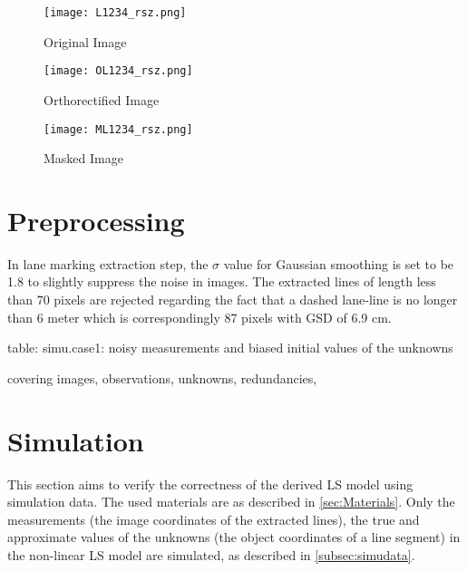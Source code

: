 \begin{figure}%
  \parbox{.475\linewidth}{
    \centering
    \texttt{[image: L1234\_rsz.png]}
    \caption{\small Original Image}
    \label{fig:OriImg}
  }
  \quad
  \parbox{.475\linewidth}{
    \centering
    \texttt{[image: OL1234\_rsz.png]}
    \caption{\small Orthorectified Image}
    \label{fig:OrthoImg}
  }
  \centering
  \parbox{.7\linewidth}{
    \texttt{[image: ML1234\_rsz.png]}
    \caption{\small Masked Image}
    \label{fig:MaskedImg}
  }
\end{figure}

\clearpage
\section{Preprocessing}
\label{sec:preprocessing}

In lane marking extraction step, the $\sigma$ value for Gaussian smoothing is set to be 1.8 %
to slightly suppress the noise in images.
The extracted lines of length less than 70 pixels are rejected %
regarding the fact that a dashed lane-line is no longer than 6 meter which is correspondingly 87 pixels with GSD of 6.9 cm.

table:
simu.case1: noisy measurements and biased initial values of the unknowns

covering images, observations, unknowns, redundancies, 


\section{Simulation}
\label{sec:simulation}
This section aims to verify the correctness of the derived LS model using simulation data. The used materials are as described in \cref{sec:Materials}. Only the measurements (the image coordinates of the extracted lines), the true and approximate values of the unknowns (the object coordinates of a line segment) in the non-linear LS model are simulated, as described in \cref{subsec:simudata}.

